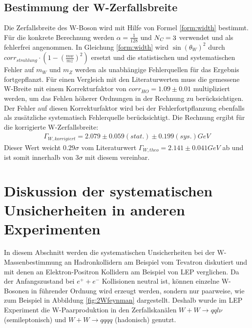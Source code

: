 \documentclass[a4paper,12pt]{article}
\begin{document}
\subsection{Bestimmung der W-Zerfallsbreite}
Die Zerfallsbreite des W-Boson wird mit Hilfe von Formel \ref{form:width} bestimmt. Für die konkrete Berechnung
werden $\alpha = \frac{1}{128}$ und $N_{\textsl{C}}=3$ verwendet und als fehlerfrei angenommen. In Gleichung \ref{form:width}
wird $\sin(\theta_{W})^{2} $
 durch $corr_{strahlung}\cdot(1-(\frac{mw}{mz})^{2})$ ersetzt und die statistischen und
systematischen Fehler auf $m_{W}$ und $m_{Z}$ werden als unabhängige Fehlerquellen für das Ergebnis fortgepflanzt. Für 
einen Vergleich mit den Literaturwerten muss die gemessene W-Breite mit einem Korrekturfaktor
von $corr_{HO}=1.09 \pm 0.01$ multipliziert werden\cite{versuchsanleitung}, um das Fehlen höherer Ordnungen in der Rechnung zu berücksichtigen. Der
Fehler auf diesen Korrekturfaktor wird bei der Fehlerfortpflanzung ebenfalls als zusätzliche systematisch Fehlerquelle
berücksichtigt. Die Rechnung ergibt für die korrigierte W-Zerfallsbreite:
\begin{align*}
	Γ_{W,korrigiert} =  2.079 ± 0.059 (stat.) ± 0.199(sys.) \si{GeV}
\end{align*}
Dieser Wert weicht $0.29\sigma$ vom Literaturwert\cite{versuchsanleitung}
$Γ_{W,theo} = 2.141 \pm 0.041\si{GeV}$
ab und ist somit innerhalb von $3\sigma$ mit diesem vereinbar.

\newpage
\section{Diskussion der systematischen Unsicherheiten in anderen Experimenten}
In diesem Abschnitt werden die systematischen Unsicherheiten bei der W-Massenbestimmung an Hadronkollidern am Beispiel vom Tevatron diskutiert
und mit denen an Elektron-Positron Kollidern am Beispiel von LEP verglichen. Da der Anfangszustand bei $e^{+}+e^{-}$ Kollisionen neutral ist, können einzelne W-Bosonen
in führender Ordnung wird erzeugt werden, sondern nur paarweise, wie zum Beispiel in Abbildung \ref{fig:2Wfeynman} dargestellt. Deshalb wurde im LEP Experiment die W-Paarproduktion in den \cite{Achard:2005qy}
Zerfallskanälen $W+W \rightarrow qql\nu$ (semileptonisch) und $W+W \rightarrow qqqq$ (hadonisch) genutzt.
\end{document}
